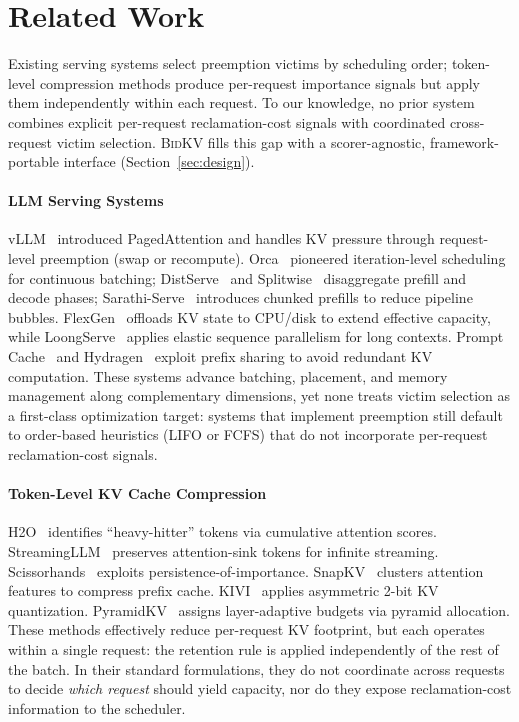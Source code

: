 \documentclass[conference]{IEEEtran}
\newcommand{\bidkv}{\textsc{BidKV}\xspace}
\begin{document}
\section{Related Work}\label{sec:related}

Existing serving systems select preemption victims by scheduling order;
token-level compression methods produce per-request importance signals
but apply them independently within each request.
To our knowledge, no prior system combines explicit per-request
reclamation-cost signals with coordinated cross-request victim selection.
\bidkv fills this gap with a scorer-agnostic, framework-portable interface
(Section~\ref{sec:design}).

\paragraph{LLM Serving Systems}
vLLM~\cite{Kwon2023} introduced PagedAttention and handles KV pressure through
request-level preemption (swap or recompute).
Orca~\cite{Yu2022} pioneered iteration-level scheduling for continuous
batching; DistServe~\cite{Zhong2024} and Splitwise~\cite{Patel2024}
disaggregate prefill and decode phases;
Sarathi-Serve~\cite{Agrawal2024sarathiserve} introduces chunked prefills to
reduce pipeline bubbles.
FlexGen~\cite{Sheng2023flexgen} offloads KV state to CPU/disk to extend
effective capacity, while LoongServe~\cite{Wu2024loongserve} applies elastic
sequence parallelism for long contexts.
Prompt Cache~\cite{Gim2024} and Hydragen~\cite{Juravsky2024} exploit prefix
sharing to avoid redundant KV computation.
These systems advance batching, placement, and memory management along
complementary dimensions, yet none treats victim selection as a first-class
optimization target: systems that implement preemption still default to
order-based heuristics (LIFO or FCFS) that do not incorporate per-request
reclamation-cost signals.

\paragraph{Token-Level KV Cache Compression}
H2O~\cite{Zhang2023h2o} identifies ``heavy-hitter'' tokens via
cumulative attention scores.
Streaming\-LLM~\cite{Xiao2024} preserves attention-sink tokens
for infinite streaming.
Scissorhands~\cite{Liu2023scissorhands} exploits persistence-of-importance.
SnapKV~\cite{Li2024snapkv} clusters attention features to compress prefix
cache.
KIVI~\cite{Liu2024kivi} applies asymmetric 2-bit KV quantization.
PyramidKV~\cite{Zhang2025pyramidkv} assigns layer-adaptive budgets via pyramid
allocation.
These methods effectively reduce per-request KV footprint, but each operates
within a single request: the retention rule is applied independently of the
rest of the batch.  In their standard formulations, they do not coordinate
across requests to decide \emph{which request} should yield capacity, nor do
they expose reclamation-cost information to the scheduler.
\end{document}
